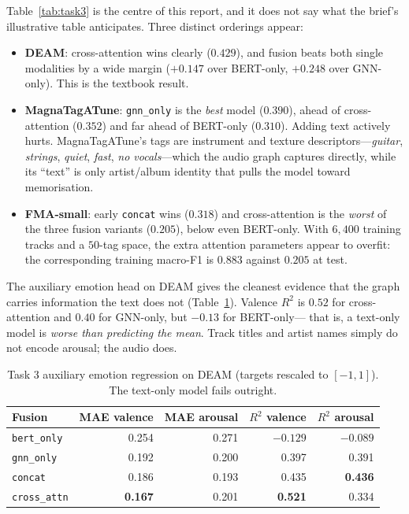 \documentclass{article}
\begin{document}
Table~\ref{tab:task3} is the centre of this report, and it does not say what the
brief's illustrative table anticipates. Three distinct orderings appear:

\begin{itemize}
  \item \textbf{DEAM}: cross-attention wins clearly ($0.429$), and fusion beats both
        single modalities by a wide margin ($+0.147$ over BERT-only, $+0.248$ over
        GNN-only). This is the textbook result.
  \item \textbf{MagnaTagATune}: \texttt{gnn\_only} is the \emph{best} model
        ($0.390$), ahead of cross-attention ($0.352$) and far ahead of BERT-only
        ($0.310$). Adding text actively hurts. MagnaTagATune's tags are
        instrument and texture descriptors---\emph{guitar}, \emph{strings},
        \emph{quiet}, \emph{fast}, \emph{no vocals}---which the audio graph
        captures directly, while its ``text'' is only artist/album identity that
        pulls the model toward memorisation.
  \item \textbf{FMA-small}: early \texttt{concat} wins ($0.318$) and
        cross-attention is the \emph{worst} of the three fusion variants ($0.205$),
        below even BERT-only. With $6{,}400$ training tracks and a $50$-tag space,
        the extra attention parameters appear to overfit: the corresponding
        training macro-F1 is $0.883$ against $0.205$ at test.
\end{itemize}

The auxiliary emotion head on DEAM gives the cleanest evidence that the graph
carries information the text does not (Table~\ref{tab:emotion}). Valence $R^2$ is
$0.52$ for cross-attention and $0.40$ for GNN-only, but $-0.13$ for BERT-only---%
that is, a text-only model is \emph{worse than predicting the mean}. Track titles
and artist names simply do not encode arousal; the audio does.

\begin{table}[t]
\caption{Task 3 auxiliary emotion regression on DEAM (targets rescaled to
$[-1,1]$). The text-only model fails outright.}
\label{tab:emotion}
\centering
\small
\begin{tabular}{lrrrr}
\toprule
Fusion & MAE valence & MAE arousal & $R^2$ valence & $R^2$ arousal \\
\midrule
\texttt{bert\_only}  & 0.254 & 0.271 & $-0.129$ & $-0.089$ \\
\texttt{gnn\_only}   & 0.192 & 0.200 & 0.397 & 0.391 \\
\texttt{concat}      & 0.186 & 0.193 & 0.435 & \textbf{0.436} \\
\texttt{cross\_attn} & \textbf{0.167} & 0.201 & \textbf{0.521} & 0.334 \\
\bottomrule
\end{tabular}
\end{table}
\end{document}
